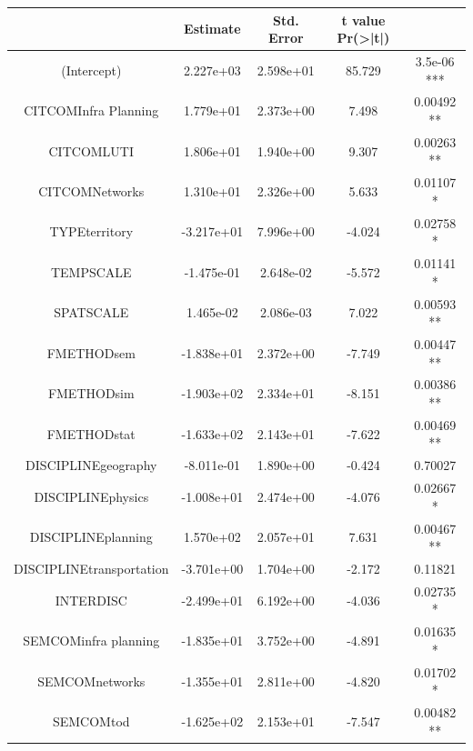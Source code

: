{\centering
\begin{tabular}{|c|c|c|c|c|}
\hline
                       &    Estimate & Std. Error & t value Pr(>|t|)    \\\hline
(Intercept)            &   2.227e+03 & 2.598e+01 & 85.729 & 3.5e-06 *** \\
CITCOMInfra Planning   &   1.779e+01 & 2.373e+00  & 7.498 & 0.00492 ** \\
CITCOMLUTI             &   1.806e+01 & 1.940e+00 &  9.307 & 0.00263 ** \\
CITCOMNetworks         &   1.310e+01 & 2.326e+00 &  5.633 & 0.01107 *  \\
TYPEterritory          &  -3.217e+01 & 7.996e+00 & -4.024 & 0.02758 *  \\
TEMPSCALE              &  -1.475e-01 & 2.648e-02 & -5.572 & 0.01141 *  \\
SPATSCALE              &   1.465e-02 & 2.086e-03 &  7.022 & 0.00593 ** \\
FMETHODsem             &  -1.838e+01 & 2.372e+00 & -7.749 & 0.00447 ** \\
FMETHODsim             &  -1.903e+02 & 2.334e+01 & -8.151 & 0.00386 ** \\
FMETHODstat            &  -1.633e+02 & 2.143e+01 & -7.622 & 0.00469 ** \\
DISCIPLINEgeography    &  -8.011e-01 & 1.890e+00 & -0.424 & 0.70027    \\
DISCIPLINEphysics      &  -1.008e+01 & 2.474e+00 & -4.076 & 0.02667 *  \\
DISCIPLINEplanning     &   1.570e+02 & 2.057e+01 &  7.631 & 0.00467 ** \\
DISCIPLINEtransportation & -3.701e+00 & 1.704e+00 & -2.172 & 0.11821    \\
INTERDISC              &  -2.499e+01 & 6.192e+00 & -4.036 & 0.02735 *  \\
SEMCOMinfra planning   &  -1.835e+01 & 3.752e+00 & -4.891 & 0.01635 *  \\
SEMCOMnetworks         &  -1.355e+01 & 2.811e+00 & -4.820 & 0.01702 *  \\
SEMCOMtod              &  -1.625e+02 & 2.153e+01 & -7.547 & 0.00482 ** \\\hline
\end{tabular}
}












